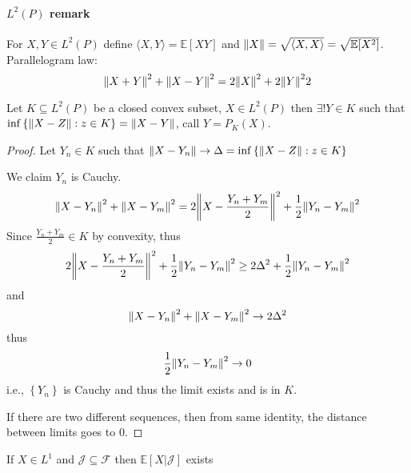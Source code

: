 \paragraph{$L^2(P)$ remark}
For $X,Y\in L^2(P)$  define $\langle X, Y \rangle = \mathbb{E}[XY]$  and $\norm{X} = \sqrt{\langle X, X \rangle} = \sqrt{\mathbb{E}[X^2]}$.
Parallelogram law:
$$\norm{X+Y}^2 + \norm{X-Y}^2 = 2\norm{X}^2 + 2\norm{Y}^22$$
\begin{theorem}
	Let $K\subseteq L^2(P)$ be a closed convex subset, $X \in  L^2(P)$ then $\exists ! Y\in K$ such that $\inf \left\{ \norm{X-Z}: z\in K \right\} = \norm{X-Y}$, call $Y=P_K(X)$.
	\begin{proof}
		Let $Y_n \in K$ such that $\norm{X-Y_n} \to \Delta = \inf \left\{ \norm{X-Z}: z\in K \right\} $
		
		We claim $Y_n$ is Cauchy.
		$$\norm{X-Y_n}^2 + \norm{X-Y_m}^2 = 2\norm{X - \frac{Y_n+Y_m}{2}}^2 + \frac{1}{2} \norm{Y_n-Y_m}^2$$
	Since $\frac{Y_n+Y_m}{2} \in K$ by convexity, thus
	$$ 2\norm{X - \frac{Y_n+Y_m}{2}}^2 + \frac{1}{2} \norm{Y_n-Y_m}^2 \geq 2\Delta^2 + \frac{1}{2} \norm{Y_n-Y_m}^2$$
and 
	$$\norm{X-Y_n}^2 + \norm{X-Y_m}^2 \to 2\Delta^2$$
	thus	$$ \frac{1}{2} \norm{Y_n-Y_m}^2 \to 0$$
i.e., $\left\{ Y_n \right\}$ is Cauchy and thus the limit exists and is in $K$.

If there are two different sequences, then from same identity, the distance between limits goes to $0$.               
	\end{proof}
\end{theorem}
\begin{theorem}
	If $X\in L^1$ and $\mathcal{J} \subseteq  \mathcal{F}$ then $\mathbb{E} [X|\mathcal{J} ]$ exists
\end{theorem}